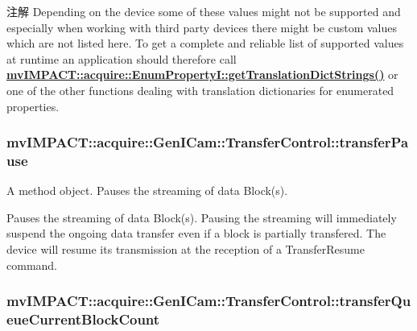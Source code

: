 \begin{DoxyNote}{注解}
Depending on the device some of these values might not be supported and especially when working with third party devices there might be custom values which are not listed here. To get a complete and reliable list of supported values at runtime an application should therefore call {\bfseries \hyperlink{classmv_i_m_p_a_c_t_1_1acquire_1_1_enum_property_i_a0ba6ccbf5ee69784d5d0b537924d26b6}{mv\+I\+M\+P\+A\+C\+T\+::acquire\+::\+Enum\+Property\+I\+::get\+Translation\+Dict\+Strings()}} or one of the other functions dealing with translation dictionaries for enumerated properties. 
\end{DoxyNote}
\hypertarget{classmv_i_m_p_a_c_t_1_1acquire_1_1_gen_i_cam_1_1_transfer_control_a963353ae0411e4e5ab0bd08b4dbf7eae}{
\subsubsection[{transfer\+Pause}]{ mv\+I\+M\+P\+A\+C\+T\+::acquire\+::\+Gen\+I\+Cam\+::\+Transfer\+Control\+::transfer\+Pause}}\label{classmv_i_m_p_a_c_t_1_1acquire_1_1_gen_i_cam_1_1_transfer_control_a963353ae0411e4e5ab0bd08b4dbf7eae}


A method object. Pauses the streaming of data Block(s). 

Pauses the streaming of data Block(s). Pausing the streaming will immediately suspend the ongoing data transfer even if a block is partially transfered. The device will resume its transmission at the reception of a Transfer\+Resume command. \hypertarget{classmv_i_m_p_a_c_t_1_1acquire_1_1_gen_i_cam_1_1_transfer_control_ac2afe03dc422b31cc68480a9e843f11f}{
\subsubsection[{transfer\+Queue\+Current\+Block\+Count}]{ mv\+I\+M\+P\+A\+C\+T\+::acquire\+::\+Gen\+I\+Cam\+::\+Transfer\+Control\+::transfer\+Queue\+Current\+Block\+Count}}\label{classmv_i_m_p_a_c_t_1_1acquire_1_1_gen_i_cam_1_1_transfer_control_ac2afe03dc422b31cc68480a9e843f11f}


